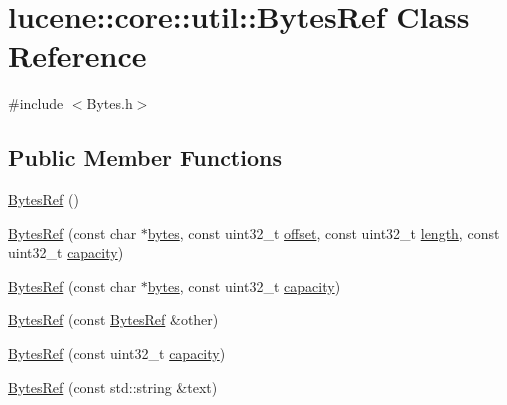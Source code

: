 \hypertarget{classlucene_1_1core_1_1util_1_1BytesRef}{}\section{lucene\+:\+:core\+:\+:util\+:\+:Bytes\+Ref Class Reference}
\label{classlucene_1_1core_1_1util_1_1BytesRef}


{\ttfamily \#include $<$Bytes.\+h$>$}

\subsection*{Public Member Functions}
\begin{DoxyCompactItemize}
\item 
\mbox{\hyperlink{classlucene_1_1core_1_1util_1_1BytesRef_a5c352a399671a6ed5e04cd334149b662}{Bytes\+Ref}} ()
\item 
\mbox{\hyperlink{classlucene_1_1core_1_1util_1_1BytesRef_a3cb2618be430384290cd84c488f8b07d}{Bytes\+Ref}} (const char $\ast$\mbox{\hyperlink{classlucene_1_1core_1_1util_1_1BytesRef_a50b260da81b7f31687ac167ff52c9a1c}{bytes}}, const uint32\+\_\+t \mbox{\hyperlink{classlucene_1_1core_1_1util_1_1BytesRef_a00b5e81a37602c7af1fde636cd44f12b}{offset}}, const uint32\+\_\+t \mbox{\hyperlink{classlucene_1_1core_1_1util_1_1BytesRef_a198e62928759942ffc9d2c3ff877b4e4}{length}}, const uint32\+\_\+t \mbox{\hyperlink{classlucene_1_1core_1_1util_1_1BytesRef_a9e1775d26ac1dec137aa57fae87f654c}{capacity}})
\item 
\mbox{\hyperlink{classlucene_1_1core_1_1util_1_1BytesRef_aad74198593bb0663f505c2751940b68b}{Bytes\+Ref}} (const char $\ast$\mbox{\hyperlink{classlucene_1_1core_1_1util_1_1BytesRef_a50b260da81b7f31687ac167ff52c9a1c}{bytes}}, const uint32\+\_\+t \mbox{\hyperlink{classlucene_1_1core_1_1util_1_1BytesRef_a9e1775d26ac1dec137aa57fae87f654c}{capacity}})
\item 
\mbox{\hyperlink{classlucene_1_1core_1_1util_1_1BytesRef_a88c7864495cbe868a1939a2e2a7953de}{Bytes\+Ref}} (const \mbox{\hyperlink{classlucene_1_1core_1_1util_1_1BytesRef}{Bytes\+Ref}} \&other)
\item 
\mbox{\hyperlink{classlucene_1_1core_1_1util_1_1BytesRef_add244078b49f9f132839a804f1312223}{Bytes\+Ref}} (const uint32\+\_\+t \mbox{\hyperlink{classlucene_1_1core_1_1util_1_1BytesRef_a9e1775d26ac1dec137aa57fae87f654c}{capacity}})
\item 
\mbox{\hyperlink{classlucene_1_1core_1_1util_1_1BytesRef_a27fd90759a52d4ea1fe88e5af2f7bb92}{Bytes\+Ref}} (const std\+::string \&text)

\end{DoxyCompactItemize}
